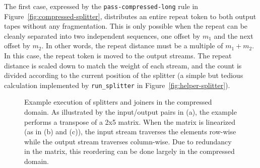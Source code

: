 The first case, expressed by the {\tt pass-compressed-long} rule in
Figure~\ref{fig:compressed-splitter}, distributes an entire repeat
token to both output tapes without any fragmentation.  This is only
possible when the repeat can be cleanly separated into two independent
sequences, one offset by $m_1$ and the next offset by $m_2$.  In other
words, the repeat distance must be a multiple of $m_1+m_2$.  In this
case, the repeat token is moved to the output streams.  The repeat
distance is scaled down to match the weight of each stream, and the
count is divided according to the current position of the splitter (a
simple but tedious calculation implemented by {\tt run\_splitter} in
Figure~\ref{fig:helper-splitter}).

\begin{figure*}[t]
\vspace{6pt}
\caption{Example execution of splitters and joiners in the compressed
  domain.  As illustrated by the input/output pairs in (a), the
  example performs a transpose of a 2x5 matrix.  When the matrix is
  linearized (as in (b) and (c)), the input stream traverses the
  elements row-wise while the output stream traverses column-wise.
  Due to redundancy in the matrix, this reordering can be done largely
  in the compressed domain.  \protect\label{fig:sj-example}}
\end{figure*}

